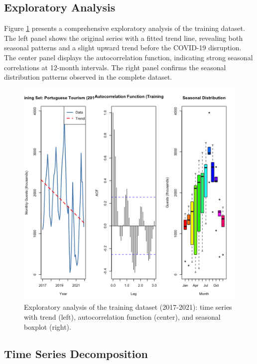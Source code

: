 \documentclass[journal]{IEEEtran}
\begin{document}
\subsection{Exploratory Analysis}

Figure \ref{fig:exploratory} presents a comprehensive exploratory analysis of the training dataset. The left panel shows the original series with a fitted trend line, revealing both seasonal patterns and a slight upward trend before the COVID-19 disruption. The center panel displays the autocorrelation function, indicating strong seasonal correlations at 12-month intervals. The right panel confirms the seasonal distribution patterns observed in the complete dataset.

\begin{figure}[h]
    \centering
    \includegraphics[width=1\linewidth]{plots/exploratory-analysis.png}
    \caption{Exploratory analysis of the training dataset (2017-2021): time series with trend (left), autocorrelation function (center), and seasonal boxplot (right).}
    \label{fig:exploratory}
\end{figure}

\subsection{Time Series Decomposition}
\end{document}

